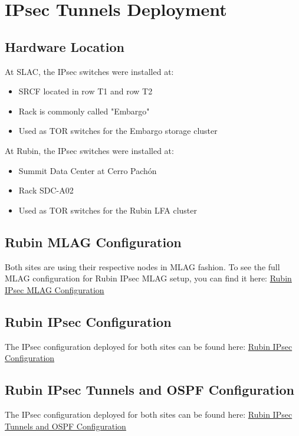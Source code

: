 \section{IPsec Tunnels Deployment}

\subsection{Hardware Location}
At SLAC, the IPsec switches were installed at:
    \begin{itemize}
        \item SRCF located in row T1 and row T2
        \item Rack is commonly called "Embargo"
        \item Used as TOR switches for the Embargo storage cluster
    \end{itemize}

At Rubin, the IPsec switches were installed at:
    \begin{itemize}
        \item Summit Data Center at Cerro Pachón
        \item Rack SDC-A02
        \item Used as TOR switches for the Rubin LFA cluster
    \end{itemize}

\subsection{Rubin MLAG Configuration}
Both sites are using their respective nodes in MLAG fashion. To see the full MLAG configuration for Rubin IPsec MLAG setup, you can find it here: \href{https://confluence.lsstcorp.org/display/IT/ITTN-075+-+Rubin+IPsec+MLAG+Configuration}{Rubin IPsec MLAG Configuration}

\subsection{Rubin IPsec Configuration}

The IPsec configuration deployed for both sites can be found here: \href{https://confluence.lsstcorp.org/display/IT/ITTN-075+-+IPsec+Configuration}{Rubin IPsec Configuration}

\subsection{Rubin IPsec Tunnels and OSPF Configuration}
The IPsec configuration deployed for both sites can be found here: \href{https://confluence.lsstcorp.org/display/IT/ITTN-075+-+Rubin+IPsec+Tunnels+and+OSPF+Configuration}{Rubin IPsec Tunnels and OSPF Configuration}

